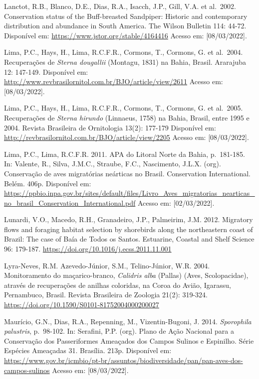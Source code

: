 \documentclass[
  oneside]{scrbook}
\begin{document}
Lanctot, R.B., Blanco, D.E., Dias, R.A., Isacch, J.P., Gill, V.A. et al.~2002. Conservation status of the Buff-breasted Sandpiper: Historic and contemporary distribution and abundance in South America. The Wilson Bulletin 114: 44-72. Disponível em: \url{https://www.jstor.org/stable/4164416} Acesso em: {[}08/03/2022{]}.

Lima, P.C., Hays, H., Lima, R.C.F.R., Cormons, T., Cormons, G. et al.~2004. Recuperações de \emph{Sterna dougallii} (Montagu, 1831) na Bahia, Brasil. Ararajuba 12: 147-149. Disponível em: \url{http://www.revbrasilornitol.com.br/BJO/article/view/2611} Acesso em: {[}08/03/2022{]}.

Lima, P.C., Hays, H., Lima, R.C.F.R., Cormons, T., Cormons, G. et al.~2005. Recuperações de \emph{Sterna hirundo} (Linnaeus, 1758) na Bahia, Brasil, entre 1995 e 2004. Revista Brasileira de Ornitologia 13(2): 177-179 Disponível em: \url{http://revbrasilornitol.com.br/BJO/article/view/2205} Acesso em: {[}08/03/2022{]}.

Lima, P.C., Lima, R.C.F.R. 2011. APA do Litoral Norte da Bahia, p.~181-185. In: Valente, R., Silva, J.M.C., Straube, F.C., Nascimento, J.L.X. (org). Conservação de aves migratórias neárticas no Brasil. Conservation International. Belém. 406p. Disponível em: \url{https://ppbio.inpa.gov.br/sites/default/files/Livro_Aves_migratorias_nearticas_no_brasil_Conservation_International.pdf} Acesso em: {[}02/03/2022{]}.

Lunardi, V.O., Macedo, R.H., Granadeiro, J.P., Palmeirim, J.M. 2012. Migratory ﬂows and foraging habitat selection by shorebirds along the northeastern coast of Brazil: The case of Baía de Todos os Santos. Estuarine, Coastal and Shelf Science 96: 179-187. \url{https://doi.org/10.1016/j.ecss.2011.11.001}

Lyra-Neves, R.M. Azevedo-Júnior, S.M., Telino-Júnior, W.R. 2004. Monitoramento do maçarico-branco, \emph{Calidris alba} (Pallas) (Aves, Scolopacidae), através de recuperações de anilhas coloridas, na Coroa do Avião, Igarassu, Pernambuco, Brasil. Revista Brasileira de Zoologia 21(2): 319-324. \url{https://doi.org/10.1590/S0101-81752004000200027}

Maurício, G.N., Dias, R.A., Repenning, M., Vizentin-Bugoni, J. 2014. \emph{Sporophila palustris}, p.~98-102. In: Serafini, P.P. (org). Plano de Ação Nacional para a Conservação dos Passeriformes Ameaçados dos Campos Sulinos e Espinilho. Série Espécies Ameaçadas 31. Brasília. 213p. Disponível em: \url{https://www.gov.br/icmbio/pt-br/assuntos/biodiversidade/pan/pan-aves-dos-campos-sulinos} Acesso em: {[}08/03/2022{]}.
\end{document}
